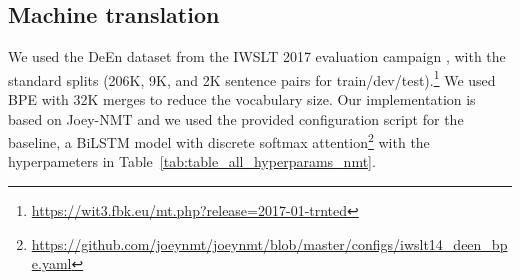 \documentclass{article}
\begin{document}
\subsection{Machine translation}

We used the DeEn dataset from the IWSLT 2017 evaluation campaign \citep{cettolo2017overview}, with the standard splits (206K, 9K, and 2K sentence pairs for train/dev/test).\footnote{\url{https://wit3.fbk.eu/mt.php?release=2017-01-trnted}} We used BPE \citep{sennrich2016neural} with 32K merges to reduce the vocabulary size.
Our implementation is based on Joey-NMT \citep{kreutzer2019joey} and we used the provided configuration script for the baseline, a BiLSTM model with discrete softmax attention\footnote{\url{https://github.com/joeynmt/joeynmt/blob/master/configs/iwslt14_deen_bpe.yaml}} with the  hyperpameters in Table~\ref{tab:table_all_hyperparams_nmt}. 

\begin{comment}
For the continuous attention models, we used the combined attention setting described above, with 30 Gaussian RBFs and  linearly spaced in  and .
\end{comment}
\end{document}
